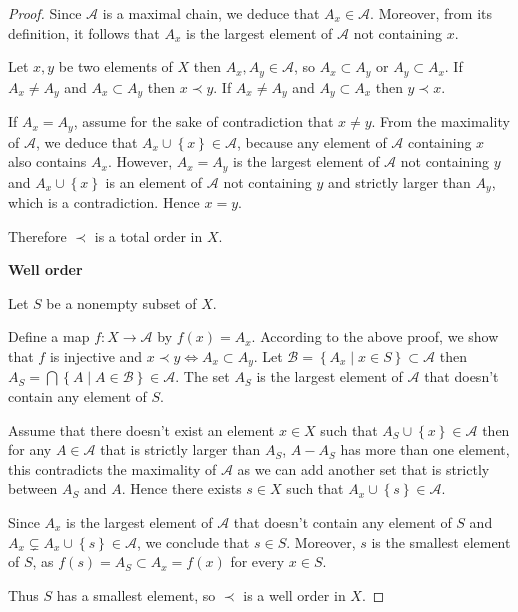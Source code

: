 \begin{proof}
	Since \( \mathscr{A} \) is a maximal chain, we deduce that \( A_{x} \in \mathscr{A} \). Moreover, from its definition, it follows that \( A_{x} \) is the largest element of \( \mathscr{A} \) not containing \( x \).

	Let \( x, y \) be two elements of \( X \) then \( A_{x}, A_{y} \in \mathscr{A} \), so \( A_{x} \subset A_{y} \) or \( A_{y} \subset A_{x} \). If \( A_{x} \ne A_{y} \) and \( A_{x} \subset A_{y} \) then \( x \prec y \). If \( A_{x} \ne A_{y} \) and \( A_{y} \subset A_{x} \) then \( y \prec x \).

	If \( A_{x} = A_{y} \), assume for the sake of contradiction that \( x \ne y \). From the maximality of \( \mathscr{A} \), we deduce that \( A_{x} \cup \left\{ x \right\} \in \mathscr{A} \), because any element of \( \mathscr{A} \) containing \(x\) also contains \(A_{x}\). However, \( A_{x} = A_{y} \) is the largest element of \( \mathscr{A} \) not containing \( y \) and \( A_{x} \cup \left\{ x \right\} \) is an element of \( \mathscr{A} \) not containing \( y \) and strictly larger than \( A_{y} \), which is a contradiction. Hence \( x = y \).

	Therefore \( \prec \) is a total order in \( X \).

	\textbf{Well order}

	Let \(S\) be a nonempty subset of \(X\).

	Define a map \( f: X \to \mathscr{A} \) by \( f(x) = A_{x} \). According to the above proof, we show that \( f \) is injective and \( x \prec y \iff A_{x} \subset A_{y} \). Let \( \mathscr{B} = \left\{ A_{x} \mid x \in S \right\} \subset \mathscr{A} \) then \( A_{S} = \bigcap \left\{ A \mid A \in \mathscr{B} \right\} \in \mathscr{A} \). The set \( A_{S} \) is the largest element of \( \mathscr{A} \) that doesn't contain any element of \( S \).

	Assume that there doesn't exist an element \( x\in X \) such that \( A_{S} \cup \left\{ x \right\} \in \mathscr{A} \) then for any \( A \in \mathscr{A} \) that is strictly larger than \( A_{S} \), \( A - A_{S} \) has more than one element, this contradicts the maximality of \( \mathscr{A} \) as we can add another set that is strictly between \( A_{S} \) and \( A \). Hence there exists \( s \in X \) such that \( A_{x} \cup \left\{ s \right\} \in \mathscr{A} \).

	Since \( A_{x} \) is the largest element of \( \mathscr{A} \) that doesn't contain any element of \( S \) and \( A_{x} \subsetneq A_{x} \cup \left\{ s \right\} \in \mathscr{A} \), we conclude that \( s \in S \). Moreover, \( s \) is the smallest element of \( S \), as \( f(s) = A_{S} \subset A_{x} = f(x) \) for every \( x \in S \).

	Thus \( S \) has a smallest element, so \( \prec \) is a well order in \(X\).
\end{proof}

